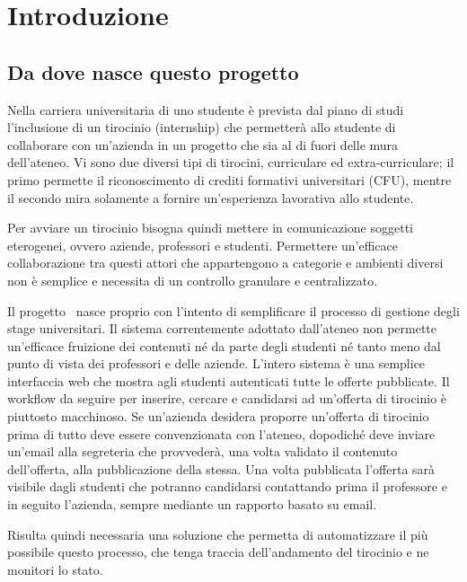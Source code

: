 \nocite{*}

\chapter{Introduzione}

\section{Da dove nasce questo progetto}

Nella carriera universitaria di uno studente è prevista dal piano di studi l'inclusione di un tirocinio (internship) che permetterà allo studente di collaborare con un'azienda in un progetto che sia al di fuori delle mura dell'ateneo. Vi sono due diversi tipi di tirocini, curriculare ed extra-curriculare; il primo permette il riconoscimento di crediti formativi universitari (CFU), mentre il secondo mira solamente a fornire un'esperienza lavorativa allo studente.

Per avviare un tirocinio bisogna quindi mettere in comunicazione soggetti eterogenei, ovvero aziende, professori e studenti. Permettere un'efficace collaborazione tra questi attori che appartengono a categorie e ambienti diversi non è semplice e necessita di un controllo granulare e centralizzato.

Il progetto \projectName~nasce proprio con l'intento di semplificare il processo di gestione degli stage universitari. Il sistema correntemente adottato dall'ateneo non permette un'efficace fruizione dei contenuti né da parte degli studenti né tanto meno dal punto di vista dei professori e delle aziende. L'intero sistema è una semplice interfaccia web che mostra agli studenti autenticati tutte le offerte pubblicate.
%
Il workflow da seguire per inserire, cercare e candidarsi ad un'offerta di tirocinio è piuttosto macchinoso. Se un'azienda desidera proporre un'offerta di tirocinio prima di tutto deve essere convenzionata con l'ateneo, dopodiché deve inviare un'email alla segreteria che provvederà, una volta validato il contenuto dell'offerta, alla pubblicazione della stessa. Una volta pubblicata l'offerta sarà visibile dagli studenti che potranno candidarsi contattando prima il professore e in seguito l'azienda, sempre mediante un rapporto basato su email. 

Risulta quindi necessaria una soluzione che permetta di automatizzare il più possibile questo processo, che tenga traccia dell'andamento del tirocinio e ne monitori lo stato.



